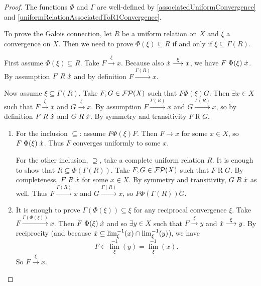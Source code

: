 \begin{proof}
The functions $\Phi$ and $\Gamma$ are well-defined by \ref{associatedUniformConvergence} and \ref{uniformRelationAssociatedToR1Convergence}.

To prove the Galois connection, let $R$ be a uniform relation on $X$ and $\xi$ a convergence on $X$. Then we need to prove $\Phi(\xi) \subseteq R$ \textup{if and only if} $\xi \subseteq \Gamma(R)$.

First assume $\Phi(\xi) \subseteq R$. Take $F\overset{\xi}{\longrightarrow} x$. Because also $\dot{x}\overset{\xi}{\longrightarrow} x$, we have $F\mathrel{\Phi(\xi)}\dot{x}$. By assumption $F\mathrel{R}\dot{x}$ and by definition $F\overset{\Gamma(R)}{\longrightarrow} x$.

Now assume $\xi \subseteq \Gamma(R)$. Take $F,G\in \operatorname{\mathcal{FP}}(X)$ such that $F\mathrel{\Phi(\xi)}G$. Then $\exists x\in X$ such that $F\overset{\xi}{\longrightarrow} x$ and $G\overset{\xi}{\longrightarrow} x$. By assumption $F\overset{\Gamma(R)}{\longrightarrow} x$ and $G\overset{\Gamma(R)}{\longrightarrow} x$, so by definition $F\mathrel{R}\dot{x}$ and $G\mathrel{R}\dot{x}$. By symmetry and transitivity $F\mathrel{R}G$.

\begin{enumerate}
\item For the inclusion $\subseteq$: assume $F\mathrel{\Phi(\xi)} F$. Then $F\to x$ for some $x\in X$, so $F\mathrel{\Phi(\xi)} \dot{x}$. Thus $F$ converges uniformly to some $x$.

For the other inclusion, $\supseteq$, take a complete uniform relation $R$. It is enough to show that $R \subseteq \Phi(\Gamma(R))$. Take $F,G\in \operatorname{\mathcal{FP}}(X)$ such that $F\mathrel{R} G$. By completeness, $F\mathrel{R} \dot{x}$ for some $x\in X$. By symmetry and transitivity, $G\mathrel{R} \dot{x}$ as well. Thus $F\overset{\Gamma(R)}{\longrightarrow} x$ and $G\overset{\Gamma(R)}{\longrightarrow} x$, so $F\mathrel{\Phi(\Gamma(R))} G$.

\item It is enough to prove $\Gamma(\Phi(\xi)) \subseteq \xi$ for any reciprocal convergence $\xi$. Take $F\overset{\Gamma(\Phi(\xi))}{\longrightarrow} x$. Then $F\mathrel{\Phi(\xi)} \dot{x}$ and so $\exists y\in X$ such that $F\overset{\xi}{\longrightarrow} y$ and $\dot{x}\overset{\xi}{\longrightarrow} y$. By reciprocity (and because $\dot{x}\subseteq \lim_{\xi}^{-1}(x) \cap \lim_{\xi}^{-1}(y)$), we have
\[ F \in {\lim}_{\xi}^{-1}(y) = {\lim}_{\xi}^{-1}(x). \]
So $F\overset{\xi}{\longrightarrow} x$.
\end{enumerate}
\end{proof}

